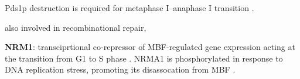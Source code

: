 \documentclass[]{article}
\begin{document}
Pds1p destruction is required for metaphase I–anaphase I transition \citep{cooper2009pds1p}. 

also involved in recombinational repair,




\textbf{NRM1}: transciprtional co-repressor of MBF-regulated gene expression acting at the transition from G1 to S phase \citep{de2006constraining, aligianni2009fission}. NRMA1 is phosphorylated in response to DNA replication stress, promoting its disassocation from MBF \citep{de2008dna}. 



\end{document}
